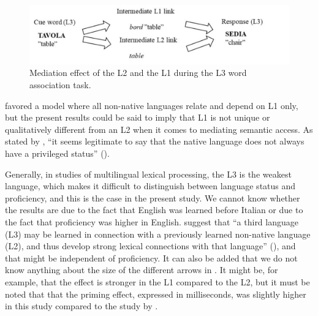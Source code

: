 \documentclass[output=paper,colorlinks,citecolor=brown,nonflat]{langsci/langscibook}
\begin{document}
\begin{figure}
    \includegraphics[width=\textwidth]{figures/Gudmundson-fig7.pdf}
    \caption{Mediation effect of the L2 and the L1 during the L3 word association task.}
    \label{fig:gudmundson:7}
\end{figure}

\citet{Abunawara1994} favored a model where all non-native languages relate and depend on L1 only, but the present results could be said to imply that L1 is not unique or qualitatively different from an L2 when it comes to mediating semantic access. As stated by \citeauthor{Szubko-Sitarek2011}, “it seems legitimate to say that the native language does not always have a privileged status” (\citeyear[170]{Szubko-Sitarek2011}).

Generally, in studies of multilingual lexical processing, the L3 is the weakest language, which makes it difficult to distinguish between language status and proficiency, and this is the case in the present study. We cannot know whether the results are due to the fact that English was learned before Italian or due to the fact that proficiency was higher in English. \citeauthor{GoralEtAl2006} suggest that “a third language (L3) may be learned in connection with a previously learned non-native language (L2), and thus develop strong lexical connections with that language” (\citeyear[244]{GoralEtAl2006}), and that might be independent of proficiency. It can also be added that we do not know anything about the size of the different arrows in . It might be, for example, that the effect is stronger in the L1 compared to the L2, but it must be noted that that the priming effect, expressed in milliseconds, was slightly higher in this study compared to the study by \citet{FitzpatrickIzura2011}.
\end{document}
